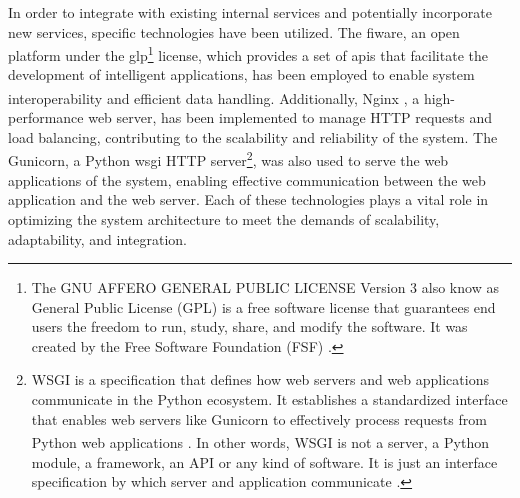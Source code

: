In order to integrate with existing internal services and potentially incorporate new services, specific technologies have been utilized. The \acrfull{fiware}\cite{fiware}, an open platform under the \acrfull{glp}\footnote{The GNU AFFERO GENERAL PUBLIC LICENSE Version 3  also know as General Public License (GPL) is a free software license that guarantees end users the freedom to run, study, share, and modify the software. It was created by the Free Software Foundation (FSF) \cite{tsai2008better}.} license, which provides a set of \glspl{api} that facilitate the development of intelligent applications, has been employed to enable system interoperability and efficient data handling. Additionally, Nginx\textsuperscript{\textregistered} \cite{nginx}, a high-performance web server, has been implemented to manage HTTP requests and load balancing, contributing to the scalability and reliability of the system. The Gunicorn, a Python \acrfull{wsgi} HTTP server\footnote{ WSGI is a specification that defines how web servers and web applications communicate in the Python ecosystem. It establishes a standardized interface that enables web servers like Gunicorn to effectively process requests from Python\textsuperscript{\textregistered} web applications \cite{eby2010pep}.  In other words, WSGI is not a server, a Python module, a framework, an API or any kind of software. It is just an interface specification by which server and application communicate \cite{clodoaldo2015}.}, was also used to serve the web applications of the system, enabling effective communication between the web application and the web server. Each of these technologies plays a vital role in optimizing the system architecture to meet the demands of scalability, adaptability, and integration.

